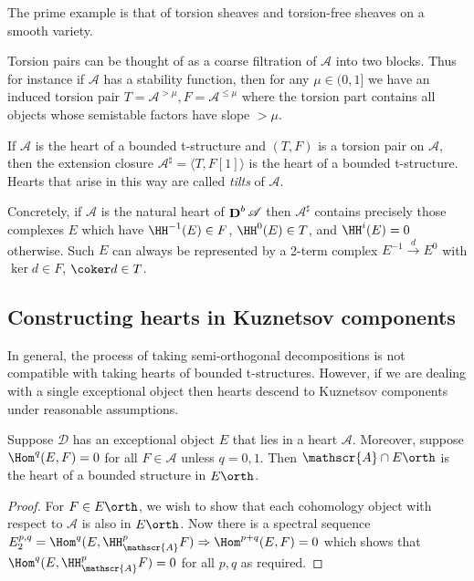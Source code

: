 The prime example is that of torsion sheaves and torsion-free sheaves on a
smooth variety.

Torsion pairs can be thought of as a coarse filtration of \(\mathscr{A}\) into
two blocks. Thus for instance if \(\mathscr{A}\) has a stability function, then
for any \(\mu\in (0,1] \) we have an induced torsion pair
\(T=\mathscr{A}^{>\mu}, F=\mathscr{A}^{\leq \mu}\) where the torsion part
contains all objects whose semistable factors have slope \(>\mu\).

\begin{proposition}
    If \(\mathscr{A}\) is the heart of a bounded t-structure and \((T,F)\) is a
    torsion pair on \(\mathscr{A}\), then the extension closure
    \(\mathscr{A}^\sharp=\langle T, F[1] \rangle\) is the heart of a bounded
    t-structure. Hearts that arise in this way are called \emph{tilts} of
    \(\mathscr{A}\).
\end{proposition}

Concretely, if \(\mathscr{A}\) is the natural heart of \(\mathop{\mathbf{D}}^b\mathscr{A}\)
then \(\mathscr{A}^\sharp\) contains precisely those complexes \(E\) which have
\(\HH^{-1}(E)\in F\), \(\HH^0(E)\in T\), and \(\HH^i(E)=0\) otherwise. Such
\(E\) can always be represented by a 2-term complex \(E^{-1}\xrightarrow{d}E^0\)
with \(\ker d\in F\), \(\coker d\in T\).

\subsection{Constructing hearts in Kuznetsov components} In general, the process
of taking semi-orthogonal decompositions is not compatible with taking hearts of
bounded t-structures. However, if we are dealing with a single exceptional
object then hearts descend to Kuznetsov components under reasonable assumptions.

\begin{proposition}
    Suppose \(\mathscr{D}\) has an exceptional object \(E\) that lies in a heart
    \(\mathscr{A}\). Moreover, suppose \(\Hom^q(E,F)=0\) for all \(F\in
    \mathscr{A}\) unless \(q=0,1\). Then \(\mathscr{A}\cap E\orth\) is the
    heart of a bounded structure in \(E\orth\).

    \begin{proof}
        For \(F\in E\orth\), we wish to show that each cohomology object with
        respect to \(\mathscr{A}\) is also in \(E\orth\). Now there is a
        spectral sequence \(E_2^{p,q}=\Hom^q(E, \HH_{\mathscr{A}}^pF)\Rightarrow
        \Hom^{p+q}(E,F)=0\) which shows that \(\Hom^q(E,
        \HH_{\mathscr{A}}^pF)=0\) for all \(p,q\) as required.
    \end{proof}
\end{proposition}


